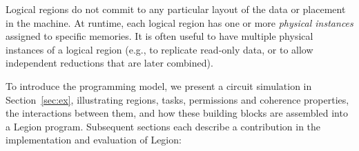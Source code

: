 \documentclass[conference]{IEEEtran}
\begin{document}
Logical regions do not commit to any particular layout of the data or
placement in the machine.  At runtime, each logical region has one or
more {\em physical instances} assigned to specific memories.  It is often useful to have multiple
physical instances of a logical region (e.g., to replicate read-only data, or to allow
independent reductions that are later combined).

To introduce the programming model, we present
a circuit simulation in
Section~\ref{sec:ex}, illustrating regions, tasks,
permissions and coherence properties, the interactions between them,
and how these building blocks are assembled into a Legion
program.  Subsequent sections each describe a contribution in the
implementation and evaluation of Legion:


 
\end{document}
